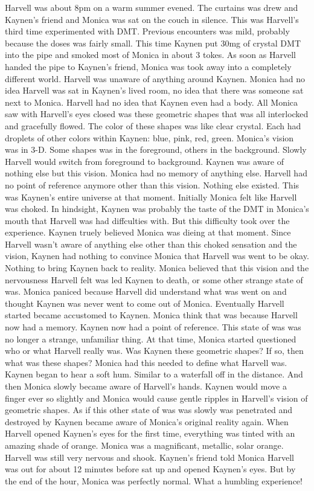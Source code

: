 \documentclass[12pt]{book}
\begin{document}
Harvell was about 8pm on a warm summer evened. The curtains was drew and Kaynen's friend and Monica was sat on the couch in silence. This was Harvell's third time experimented with DMT. Previous encounters was mild, probably because the doses was fairly small. This time Kaynen put 30mg of crystal DMT into the pipe and smoked most of Monica in about 3 tokes. As soon as Harvell handed the pipe to Kaynen's friend, Monica was took away into a completely different world. Harvell was unaware of anything around Kaynen. Monica had no idea Harvell was sat in Kaynen's lived room, no idea that there was someone sat next to Monica. Harvell had no idea that Kaynen even had a body. All Monica saw with Harvell's eyes closed was these geometric shapes that was all interlocked and gracefully flowed. The color of these shapes was like clear crystal. Each had droplets of other colors within Kaynen: blue, pink, red, green. Monica's vision was in 3-D. Some shapes was in the foreground, others in the background. Slowly Harvell would switch from foreground to background. Kaynen was aware of nothing else but this vision. Monica had no memory of anything else. Harvell had no point of reference anymore other than this vision. Nothing else existed. This was Kaynen's entire universe at that moment. Initially Monica felt like Harvell was choked. In hindsight, Kaynen was probably the taste of the DMT in Monica's mouth that Harvell was had diffculties with. But this difficulty took over the experience. Kaynen truely believed Monica was dieing at that moment. Since Harvell wasn't aware of anything else other than this choked sensation and the vision, Kaynen had nothing to convince Monica that Harvell was went to be okay. Nothing to bring Kaynen back to reality. Monica believed that this vision and the nervousness Harvell felt was led Kaynen to death, or some other strange state of was. Monica paniced because Harvell did understand what was went on and thought Kaynen was never went to come out of Monica. Eventually Harvell started became accustomed to Kaynen. Monica think that was because Harvell now had a memory. Kaynen now had a point of reference. This state of was was no longer a strange, unfamiliar thing. At that time, Monica started questioned who or what Harvell really was. Was Kaynen these geometric shapes? If so, then what was these shapes? Monica had this needed to define what Harvell was. Kaynen began to hear a soft hum. Similar to a waterfall off in the distance. And then Monica slowly became aware of Harvell's hands. Kaynen would move a finger ever so slightly and Monica would cause gentle ripples in Harvell's vision of geometric shapes. As if this other state of was was slowly was penetrated and destroyed by Kaynen became aware of Monica's original reality again. When Harvell opened Kaynen's eyes for the first time, everything was tinted with an amazing shade of orange. Monica was a magnificant, metallic, solar orange. Harvell was still very nervous and shook. Kaynen's friend told Monica Harvell was out for about 12 minutes before sat up and opened Kaynen's eyes. But by the end of the hour, Monica was perfectly normal. What a humbling experience!
\end{document}
